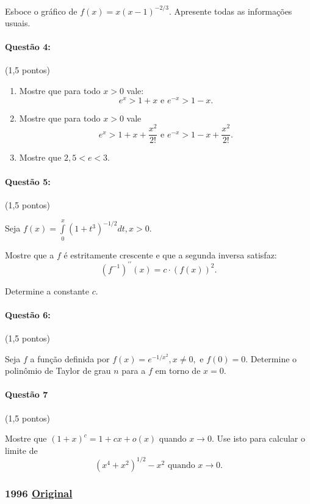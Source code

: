 \documentclass[12pt,a4paper]{article}
\newcommand{\original}[1]{\tiny \href{#1}{Original} \normalsize}
\begin{document}
Esboce o gráfico de $f(x)=x(x-1)^{-2/3}$. Apresente todas as informações usuais.

\paragraph{Questão 4:} (1,5 pontos)

\begin{enumerate}[label=(\alph*)]
\item Mostre que para todo $x>0$ vale:
$$e^x>1+x \textrm{ e } e^{-x}>1-x.$$
\item Mostre que para todo $x>0$ vale
$$e^x>1+x+\dfrac{x^2}{2!} \textrm{ e } e^{-x}>1-x+\dfrac{x^2}{2!}.$$

\item Mostre que $2,5<e<3$.
\end{enumerate}

\paragraph{Questão 5:} (1,5 pontos)

Seja $f(x)=\displaystyle\int\limits_0^x(1+t^3)^{-1/2}dt,x>0$.

Mostre que a $f$ é estritamente crescente e que a segunda inversa satisfaz:
$$(f^{-1})^{\prime \prime}(x)=c\cdot (f(x))^2.$$

Determine a constante $c$.

\paragraph{Questão 6:}(1,5 pontos)

Seja $f$ a função definida por $f(x)=e^{-1/x^2},x\neq 0,$ e $f(0)=0$. Determine o polinômio de Taylor de grau $n$ para a $f$ em torno de $x=0$.

\paragraph{Questão 7} (1,5 pontos)

Mostre que $(1+x)^{c}=1+cx+o(x)$ quando $x\rightarrow 0$. Use isto para calcular o limite de $$(x^4+x^2)^{1/2}-x^2\textrm{ quando }x\rightarrow 0.$$

\newpage
\subsubsection{1996 \original{https://drive.google.com/open?id=1MVfM8xAr69dsGtkeIC8nlgWhaQpcBC4j}}
\end{document}
